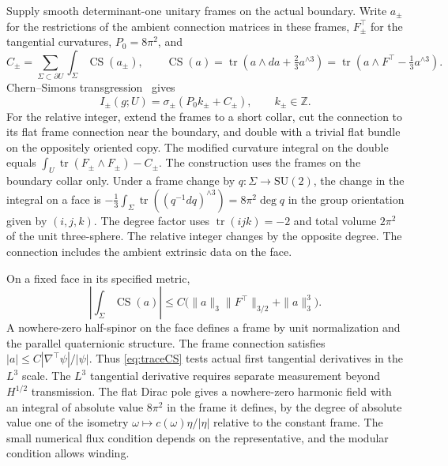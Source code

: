 \documentclass[11pt]{article}
\theoremstyle{remark}
\newcommand{\CS}{\operatorname{CS}}
\newcommand{\Tr}{\operatorname{tr}}
\begin{document}
Supply smooth determinant-one unitary frames on the actual boundary. Write \(a_\pm\) for the restrictions of the ambient connection matrices in these frames, \(F_\pm^\top\) for the tangential curvatures, \(P_0=8\pi^2\), and
\[
 C_\pm=\sum_{\Sigma\subset\partial U}\int_\Sigma
 \CS(a_\pm),\qquad
 \CS(a)=\Tr(a\wedge da+\tfrac23a^{\wedge3})
        =\Tr(a\wedge F^\top-\tfrac13a^{\wedge3}) .
\]
Chern--Simons transgression~\cite[\S3, Proposition~3.2]{ChernSimons1974Characteristic} gives
\begin{equation}
 I_\pm(g;U)=\sigma_\pm(P_0k_\pm+C_\pm),\qquad k_\pm\in\mathbb Z .
 \label{eq:charges}
\end{equation}
For the relative integer, extend the frames to a short collar, cut the connection to its flat frame connection near the boundary, and double with a trivial flat bundle on the oppositely oriented copy. The modified curvature integral on the double equals \(\int_U\Tr(F_\pm\wedge F_\pm)-C_\pm\). The construction uses the frames on the boundary collar only. Under a frame change by \(q:\Sigma\to\mathrm{SU}(2)\), the change in the integral on a face is \(-\tfrac13\int_\Sigma\Tr((q^{-1}dq)^{\wedge3})=8\pi^2\deg q\) in the group orientation given by \((i,j,k)\). The degree factor uses \(\Tr(ijk)=-2\) and total volume \(2\pi^2\) of the unit three-sphere. The relative integer changes by the opposite degree. The connection includes the ambient extrinsic data on the face.

On a fixed face in its specified metric,
\begin{equation}
 \left|\int_\Sigma\CS(a)\right|
 \le C\bigl(\|a\|_3\|F^\top\|_{3/2}+\|a\|_3^3\bigr).
 \label{eq:traceCS}
\end{equation}
A nowhere-zero half-spinor on the face defines a frame by unit normalization and the parallel quaternionic structure. The frame connection satisfies \(|a|\le C|\nabla^\top\psi|/|\psi|\). Thus \eqref{eq:traceCS} tests actual first tangential derivatives in the \(L^3\) scale. The \(L^3\) tangential derivative requires separate measurement beyond \(H^{1/2}\) transmission. The flat Dirac pole gives a nowhere-zero harmonic field with an integral of absolute value \(8\pi^2\) in the frame it defines, by the degree of absolute value one of the isometry \(\omega\mapsto c(\omega)\eta/|\eta|\) relative to the constant frame. The small numerical flux condition depends on the representative, and the modular condition allows winding.
\end{document}
